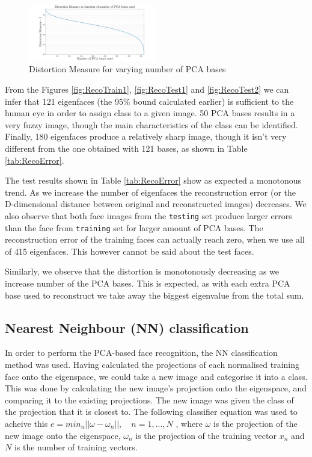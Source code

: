 \documentclass[10pt,twocolumn,letterpaper]{article}
\begin{document}
\begin{figure}[H]
\begin{center}
  
    \includegraphics[width=0.5\textwidth]{../results/DistMeasure2}

  \caption{Distortion Measure for varying number of PCA bases \label{fig:DistMeasure}}

\end{center}
\end{figure}
From the Figures \ref{fig:RecoTrain1},  \ref{fig:RecoTest1} and \ref{fig:RecoTest2} we can infer that 121 eigenfaces (the 95\% bound calculated earlier) is sufficient to the human eye in order to assign class to a given image. 50 PCA bases results in a very fuzzy image, though the main characteristics of the class can be identified. Finally, 180 eigenfaces produce a relatively sharp image, though it isn't very different from the one obtained with 121 bases, as shown in Table \ref{tab:RecoError}.

The test results shown in Table \ref{tab:RecoError} show as expected a monotonous trend. As we increase the number of eigenfaces the reconstruction error (or the D-dimensional distance between original and reconstructed images) decreases. We also observe that both face images from the {\tt\small testing} set produce larger errors than the face from {\tt\small training} set for larger amount of PCA bases. The reconstruction error of the training faces can actually reach zero, when we use all of 415 eigenfaces. This however cannot be said about the test faces.

Similarly, we observe that the distortion is monotonously decreasing as we increase number of the PCA bases. This is expected, as with each extra PCA base used to reconstruct we take away the biggest eigenvalue from the total sum.

\subsection{Nearest Neighbour (NN) classification}

In order to perform the PCA-based face recognition, the NN classification method was used. Having calculated the projections of each normalised training face onto the eigenspace, we could take a new image and categorise it into a class. This was done by calculating the new image's projection onto the eigenspace, and comparing it to the existing projections. The new image was given the class of the projection that it is closest to. The following classifier equation was used to acheive this 
$e = min_n ||\omega - \omega_n||,\quad n = 1,...,N$
, where $\omega$ is the projection of the new image onto the eigenspace, $\omega_n$ is the projection of the training vector $x_n$ and $N$ is the number of training vectors.
\end{document}
